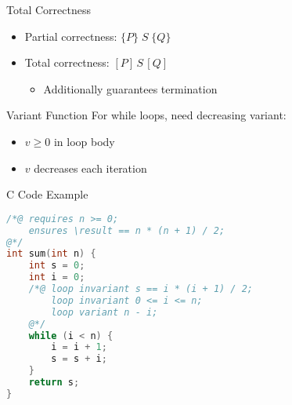 \documentclass[11pt]{beamer}
\renewcommand{\hoare}[3]{\{#1\}\; #2\; \{#3\}}
\begin{document}
\begin{frame}{Total Correctness}
    \begin{itemize}
        \item Partial correctness: $\hoare{P}{S}{Q}$
        \item Total correctness: $[P]\,S\,[Q]$
        \begin{itemize}
            \item Additionally guarantees termination
        \end{itemize}
    \end{itemize}
    
    \begin{block}{Variant Function}
        For while loops, need decreasing variant:
        \begin{itemize}
            \item $v \geq 0$ in loop body
            \item $v$ decreases each iteration
        \end{itemize}
    \end{block}
\end{frame}

\begin{frame}[fragile]{C Code Example}
    \begin{lstlisting}[language=C]
/*@ requires n >= 0;
    ensures \result == n * (n + 1) / 2;
@*/
int sum(int n) {
    int s = 0;
    int i = 0;
    /*@ loop invariant s == i * (i + 1) / 2;
        loop invariant 0 <= i <= n;
        loop variant n - i;
    @*/
    while (i < n) {
        i = i + 1;
        s = s + i;
    }
    return s;
}
    \end{lstlisting}
\end{frame}
\end{document}
